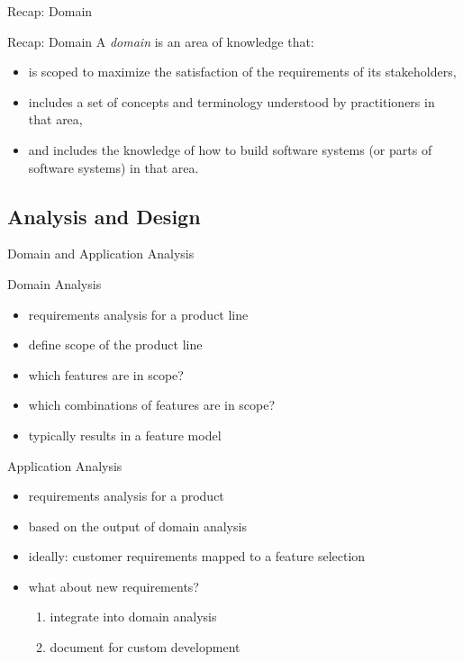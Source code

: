 \begin{frame}{Recap: Domain}
	\begin{mycolumns}[animation=none]
		\begin{definition}{Recap: Domain  \hfill\tiny\lectureintroduction}
			\mycitebegin A \emph{domain} is an area of knowledge that:
			\begin{itemize}
				\item is scoped to maximize the satisfaction of the requirements of its stakeholders,
				\item includes a set of concepts and terminology understood by practitioners in that area,
				\item and includes the knowledge of how to build software systems (or parts of
				software systems) in that area.\myciteend
			\end{itemize}
		\end{definition}
	\mynextcolumn
	\end{mycolumns}
\end{frame}

\subsection{Analysis and Design}
\begin{frame}{Domain and Application Analysis}
	\begin{mycolumns}[T,columns=3,widths={10}]
		\renewcommand{\projectcartoonwidth}{1}
	\mynextcolumn
		\begin{definition}{Domain Analysis}
			\begin{itemize}
				\item requirements analysis for a product line
				\item define scope of the product line
				\item which features are in scope?
				\item which combinations of features are in scope?
				\item typically results in a feature model
			\end{itemize}
		\end{definition}
	\mynextcolumn
		\begin{definition}{Application Analysis}
			\begin{itemize}
				\item requirements analysis for a product
				\item based on the output of domain analysis
				\item ideally: customer requirements mapped to a feature selection
				\item what about new requirements?
					\begin{enumerate}
						\item integrate into domain analysis
						\item document for custom development
					\end{enumerate}
			\end{itemize}
		\end{definition}
	\end{mycolumns}
\end{frame}

